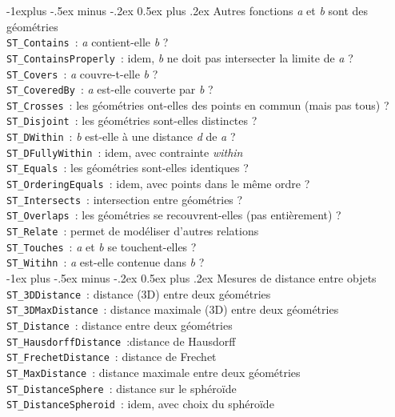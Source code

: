 \documentclass[10pt,landscape, a4paper]{article}
\makeatletter
\renewcommand{\section}{\@startsection{section}{1}{0mm}%
                                {-1ex plus -.5ex minus -.2ex}%
                                {0.5ex plus .2ex}%
                                {\normalfont\large\bfseries}}
\renewcommand{\subsection}{\@startsection{subsection}{2}{0mm}%
                                {-1explus -.5ex minus -.2ex}%
                                {0.5ex plus .2ex}%
                                {\normalfont\normalsize\bfseries}}
\makeatother
\begin{document}
\begin{multicols}{3}
	\subsection{Autres fonctions}
 \hspace{0.25em} {\scriptsize\emph{a} et \emph{b} sont des géométries}\\
\texttt{ST\_Contains}~: \emph{a} contient-elle \emph{b} ?\\
\texttt{ST\_ContainsProperly}~: idem, \emph{b} ne doit pas intersecter la limite de \emph{a} ?\\
\texttt{ST\_Covers}~: \emph{a} couvre-t-elle \emph{b} ?\\
\texttt{ST\_CoveredBy}~: \emph{a} est-elle couverte par \emph{b} ?\\
\texttt{ST\_Crosses}~: les géométries ont-elles des points en commun (mais pas tous) ?\\
\texttt{ST\_Disjoint}~: les géométries sont-elles distinctes ?\\
\texttt{ST\_DWithin}~: \emph{b} est-elle à une distance \emph{d} de \emph{a} ? \\
\texttt{ST\_DFullyWithin}~: idem, avec contrainte \emph{within}\\
\texttt{ST\_Equals}~: les géométries sont-elles identiques ?\\
\texttt{ST\_OrderingEquals}~: idem, avec points dans le même ordre ?\\
\texttt{ST\_Intersects}~: intersection entre géométries ?\\
\texttt{ST\_Overlaps}~: les géométries se recouvrent-elles (pas entièrement) ?\\

\texttt{ST\_Relate}~: permet de modéliser d'autres relations\\
\texttt{ST\_Touches}~: \emph{a} et \emph{b} se touchent-elles ?\\
\texttt{ST\_Witihn}~: \emph{a} est-elle contenue dans \emph{b} ?\\

\section{Mesures de distance entre objets}
\texttt{ST\_3DDistance}~: distance (3D) entre deux géométries\\
\texttt{ST\_3DMaxDistance}~: distance maximale (3D) entre deux géométries\\
\texttt{ST\_Distance}~: distance entre deux géométries\\
\texttt{ST\_HausdorffDistance}~:distance de Hausdorff\\
\texttt{ST\_FrechetDistance}~: distance de Frechet\\
\texttt{ST\_MaxDistance}~: distance maximale entre deux géométries\\
\texttt{ST\_DistanceSphere}~: distance sur le sphéroïde\\
\texttt{ST\_DistanceSpheroid}~: idem, avec choix du sphéroïde\\


\end{multicols}
\end{document}
